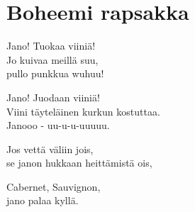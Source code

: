 \section{Boheemi rapsakka}

Jano! Tuokaa viiniä! \\
Jo kuivaa meillä suu, \\
pullo punkkua wuhuu!

Jano! Juodaan viiniä! \\
Viini täyteläinen kurkun kostuttaa. \\
Janooo - uu-u-u-uuuuu.

Jos vettä väliin jois, \\
se janon hukkaan heittämistä ois,

Cabernet, Sauvignon, \\
jano palaa kyllä.